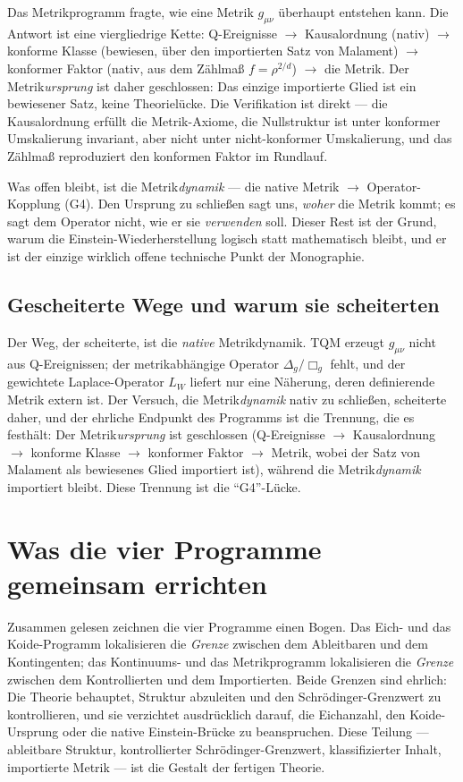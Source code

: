 \documentclass[10pt,twoside,openany]{book}
\begin{document}
Das Metrikprogramm fragte, wie eine Metrik $g_{\mu\nu}$ überhaupt entstehen kann. Die
Antwort ist eine viergliedrige Kette: Q-Ereignisse $\to$ Kausalordnung (nativ) $\to$
konforme Klasse (bewiesen, über den importierten Satz von Malament) $\to$ konformer
Faktor (nativ, aus dem Zählmaß $f=\rho^{2/d}$) $\to$ die Metrik. Der
Metrik\emph{ursprung} ist daher geschlossen: Das einzige importierte Glied ist ein
bewiesener Satz, keine Theorielücke. Die Verifikation ist direkt --- die Kausalordnung
erfüllt die Metrik-Axiome, die Nullstruktur ist unter konformer Umskalierung invariant,
aber nicht unter nicht-konformer Umskalierung, und das Zählmaß reproduziert den konformen
Faktor im Rundlauf.

Was offen bleibt, ist die Metrik\emph{dynamik} --- die native Metrik $\to$
Operator-Kopplung (G4). Den Ursprung zu schließen sagt uns, \emph{woher} die Metrik
kommt; es sagt dem Operator nicht, wie er sie \emph{verwenden} soll. Dieser Rest ist der
Grund, warum die Einstein-Wiederherstellung logisch statt mathematisch bleibt, und er ist
der einzige wirklich offene technische Punkt der Monographie.

\subsection{Gescheiterte Wege und warum sie scheiterten}

Der Weg, der scheiterte, ist die \emph{native} Metrikdynamik. TQM erzeugt $g_{\mu\nu}$
nicht aus Q-Ereignissen; der metrikabhängige Operator $\Delta_g/\Box_g$ fehlt, und der
gewichtete Laplace-Operator $L_W$ liefert nur eine Näherung, deren definierende Metrik
extern ist. Der Versuch, die Metrik\emph{dynamik} nativ zu schließen, scheiterte daher,
und der ehrliche Endpunkt des Programms ist die Trennung, die es festhält: Der
Metrik\emph{ursprung} ist geschlossen (Q-Ereignisse $\to$ Kausalordnung $\to$ konforme
Klasse $\to$ konformer Faktor $\to$ Metrik, wobei der Satz von Malament als bewiesenes
Glied importiert ist), während die Metrik\emph{dynamik} importiert bleibt. Diese Trennung
ist die ``G4''-Lücke.

\section{Was die vier Programme gemeinsam errichten}

Zusammen gelesen zeichnen die vier Programme einen Bogen. Das Eich- und das
Koide-Programm lokalisieren die \emph{Grenze} zwischen dem Ableitbaren und dem
Kontingenten; das Kontinuums- und das Metrikprogramm lokalisieren die \emph{Grenze}
zwischen dem Kontrollierten und dem Importierten. Beide Grenzen sind ehrlich: Die Theorie
behauptet, Struktur abzuleiten und den Schr\"odinger-Grenzwert zu kontrollieren, und sie
verzichtet ausdrücklich darauf, die Eichanzahl, den Koide-Ursprung oder die native
Einstein-Brücke zu beanspruchen. Diese Teilung --- ableitbare Struktur, kontrollierter
Schr\"odinger-Grenzwert, klassifizierter Inhalt, importierte Metrik --- ist die Gestalt
der fertigen Theorie.
\end{document}
